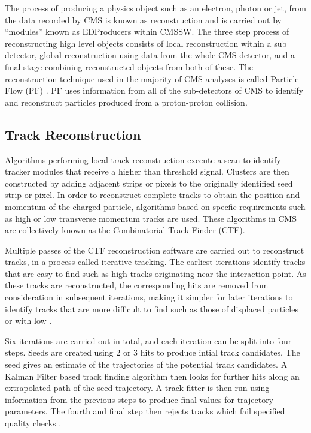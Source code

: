 The process of producing a physics object such as an electron, photon or jet, from the data recorded by CMS is
known as reconstruction and is carried out by ``modules'' known as EDProducers within CMSSW. The three
step process of reconstructing high level objects consists of local reconstruction within a sub detector,
global reconstruction using data from the whole CMS detector, and a final stage combining reconstructed
objects from both of these. The reconstruction technique used in the majority of CMS analyses is called
Particle Flow (PF) \cite{particle_flow}. PF uses information from all of the sub-detectors of CMS to identify
and reconstruct particles produced from a proton-proton collision. 

\subsection{Track Reconstruction}
\label{ss:track_reconstruction}
Algorithms performing local track reconstruction execute a scan to identify tracker modules that receive a
higher than threshold signal. Clusters are then constructed by adding adjacent strips or pixels to the
originally identified seed strip or pixel. In order to reconstruct complete tracks to obtain the position and
momentum of the charged particle, algorithms based on specfic requirements such as high or low transverse
momentum tracks are used. These algorithms in CMS are collectively known as the Combinatorial Track Finder
(CTF).

Multiple passes of the CTF reconstruction software are carried out to reconstruct tracks, in a process called
iterative tracking. The earliest iterations identify tracks that are easy to find such as high \pt tracks
originating near the interaction point. As these tracks are reconstructed, the corresponding hits are removed
from consideration in subsequent iterations, making it simpler for later iterations to identify tracks that
are more difficult to find such as those of displaced particles or with low \pt.

Six iterations are carried out in total, and each iteration can be split into four steps. Seeds are created
using 2 or 3 hits to produce intial track candidates. The seed gives an estimate of the trajectories of the
potential track candidates. A Kalman Filter \cite{kalman_filter, Speer:927395} based track finding algorithm
then looks for further hits along an extrapolated path of the seed trajectory. A track fitter is then run
using information from the previous steps to produce final values for trajectory parameters. The fourth and
final step then rejects tracks which fail specified quality checks \cite{track_reconstruction}.

